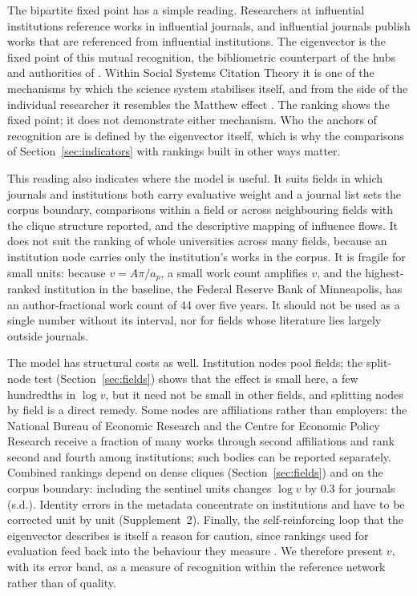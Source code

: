 The bipartite fixed point has a simple reading. Researchers at influential institutions reference works in influential journals, and influential journals publish works that are referenced from influential institutions. The eigenvector is the fixed point of this mutual recognition, the bibliometric counterpart of the hubs and authorities of \textcite{kleinberg1999authoritative}. Within Social Systems Citation Theory it is one of the mechanisms by which the science system stabilises itself, and from the side of the individual researcher it resembles the Matthew effect \citep{mertonMatthewEffectScience1968}. The ranking shows the fixed point; it does not demonstrate either mechanism. Who the anchors of recognition are is defined by the eigenvector itself, which is why the comparisons of Section~\ref{sec:indicators} with rankings built in other ways matter.

This reading also indicates where the model is useful. It suits fields in which journals and institutions both carry evaluative weight and a journal list sets the corpus boundary, comparisons within a field or across neighbouring fields with the clique structure reported, and the descriptive mapping of influence flows. It does not suit the ranking of whole universities across many fields, because an institution node carries only the institution's works in the corpus. It is fragile for small units: because $v=A\pi/a_p$, a small work count amplifies $v$, and the highest-ranked institution in the baseline, the Federal Reserve Bank of Minneapolis, has an author-fractional work count of 44 over five years. It should not be used as a single number without its interval, nor for fields whose literature lies largely outside journals.

The model has structural costs as well. Institution nodes pool fields; the split-node test (Section~\ref{sec:fields}) shows that the effect is small here, a few hundredths in $\log v$, but it need not be small in other fields, and splitting nodes by field is a direct remedy. Some nodes are affiliations rather than employers: the National Bureau of Economic Research and the Centre for Economic Policy Research receive a fraction of many works through second affiliations and rank second and fourth among institutions; such bodies can be reported separately. Combined rankings depend on dense cliques (Section~\ref{sec:fields}) and on the corpus boundary: including the sentinel units changes $\log v$ by 0.3 for journals (s.d.). Identity errors in the metadata concentrate on institutions and have to be corrected unit by unit (Supplement~2). Finally, the self-reinforcing loop that the eigenvector describes is itself a reason for caution, since rankings used for evaluation feed back into the behaviour they measure \citep{espelandRankingsReactivityHow2007}. We therefore present $v$, with its error band, as a measure of recognition within the reference network rather than of quality.

